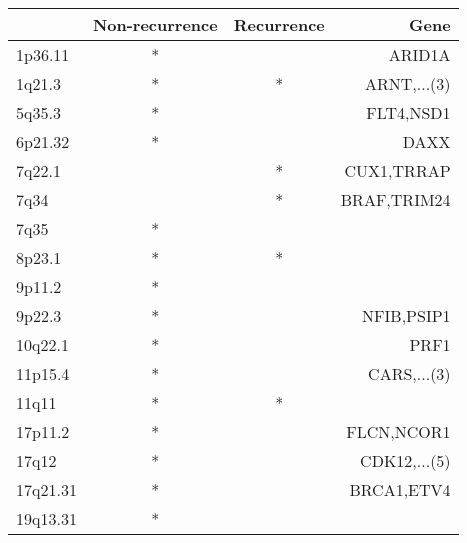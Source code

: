 \begin{tabular}{lccr}
\toprule
{} & Non-recurrence & Recurrence &          Gene \\
\midrule
1p36.11  &              * &            &        ARID1A \\
1q21.3   &              * &          * &   ARNT,...(3) \\
5q35.3   &              * &            &     FLT4,NSD1 \\
6p21.32  &              * &            &          DAXX \\
7q22.1   &                &          * &    CUX1,TRRAP \\
7q34     &                &          * &   BRAF,TRIM24 \\
7q35     &              * &            &               \\
8p23.1   &              * &          * &               \\
9p11.2   &              * &            &               \\
9p22.3   &              * &            &    NFIB,PSIP1 \\
10q22.1  &              * &            &          PRF1 \\
11p15.4  &              * &            &   CARS,...(3) \\
11q11    &              * &          * &               \\
17p11.2  &              * &            &    FLCN,NCOR1 \\
17q12    &              * &            &  CDK12,...(5) \\
17q21.31 &              * &            &    BRCA1,ETV4 \\
19q13.31 &              * &            &               \\
\bottomrule
\end{tabular}
